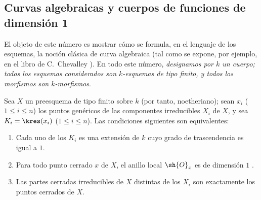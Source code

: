 \documentclass[oneside,10pt]{amsart}
\renewcommand{\leq}{\leqslant}
\newcommand{\oldpage}[2][]{\marginnote{\normalfont\footnotesize\textbf{#1}~|~#2}\ignorespaces}
\let\EGAOriginalLabel\label
\renewcommand{\label}[1]{\phantomsection\EGAOriginalLabel{#1}}
\begin{document}
\oldpage[II]{148}

\subsection{Curvas algebraicas y cuerpos de funciones de dimensión 1}
\label{subsection:II.7.4}

El objeto de este número es mostrar cómo se formula, en el lenguaje de los esquemas, la noción clásica de curva algebraica (tal como se expone, por ejemplo, en el libro de C.~Chevalley \cite{II-23}).
En todo este número, \emph{designamos por $k$ un cuerpo; todos los esquemas considerados son $k$-esquemas de tipo finito, y todos los morfismos son $k$-morfismos}.

\begin{proposition}[7.4.1]
\label{II.7.4.1}
Sea $X$ un preesquema de tipo finito sobre $k$ (por tanto, noetheriano);
sean $x_i$ ($1\leq i\leq n$) los puntos genéricos de las componentes irreducibles $X_i$ de $X$, y sea $K_i=\kres(x_i)$ ($1\leq i\leq n$).
Las condiciones siguientes son equivalentes:
\begin{enumerate}
    \item[\rm{(a)}] Cada uno de los $K_i$ es una extensión de $k$ cuyo grado de trascendencia es igual a $1$.
    \item[\rm{(b)}] Para todo punto cerrado $x$ de $X$, el anillo local $\sh{O}_x$ es de dimensión $1$ .
    \item[\rm{(c)}] Las partes cerradas irreducibles de $X$ distintas de los $X_i$ son exactamente los puntos cerrados de $X$.
\end{enumerate}
\end{proposition}
\end{document}
